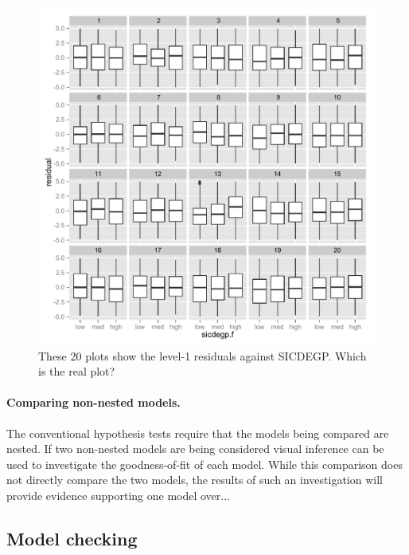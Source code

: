 \documentclass{article} %
\begin{document}
\begin{figure}
	\centering
	\includegraphics[width=\textwidth]{autism_sicdegp_true13.pdf}
	\caption{\label{fig:lineup-ranef1} These 20 plots show the level-1 residuals against SICDEGP. Which is the real plot?}
\end{figure}

\paragraph{Comparing non-nested models.}
The conventional hypothesis tests require that the models being compared are nested. If two non-nested models are being considered visual inference can be used to investigate the goodness-of-fit of each model. While this comparison does not directly compare the two models, the results of such an investigation will provide evidence supporting one model over...


\subsection{Model checking}
\end{document}
